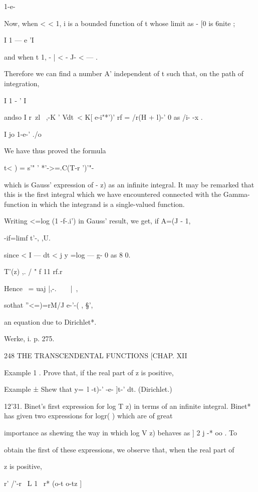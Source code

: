 1-e-



Now, when < < 1, i is a bounded function of t whose limit as - [0 is
6nite ;

I 1 — e 'I

and when t 1, - | < - J- < — .

Therefore we can find a number A' independent of t such that, on the
path of integration,

I 1 - ' I

andso I r\ zl~ ,-K ' Vdt\ < K[ e-i"*')' rf = /r(H + l)-' 0 as /i- -x .

I jo 1-e-' ./o

We have thus proved the formula

t< ) = s'" ' *'->=.C(T-r ')'"-

which is Gauss' expression of - z) as an infinite integral. It may be
remarked that this is the first integral which we have encountered
connected with the Gamma-function in which the integrand is a
single-valued function.

Writing <=log (1 -f-.i') in Gauss' result, we get, if A=(J - 1,

 -if=limf t'-, ,U.

since < I — dt < j y =log — g- 0 as 8 0.

T'(z) ,. / " f 11 rf.r

Hence \ = uaj |,-.\ \ \ \ |\ ,

sothat ''<=)=rM/J e-'-( , §',

an equation due to Dirichlet*.



Werke, i. p. 275.



248 THE TRANSCENDENTAL FUNCTIONS [CHAP. XII

Example 1 . Prove that, if the real part of z is positive,

Example ± Shew that y=\ l -t)-' -e- ]t-' dt. (Dirichlet.)

12'31. Binet's first expression for log T z) in terms of an infinite
integral. Binet* has given two expressions for logr( ) which are of
great



importance as shewing the way in which log V z) behaves as ] 2 j -* oo
. To

obtain the first of these expressions, we observe that, when the real
part of

z is positive,

r' /'-r \ L 1 \ r* (o-t o-tz ]


